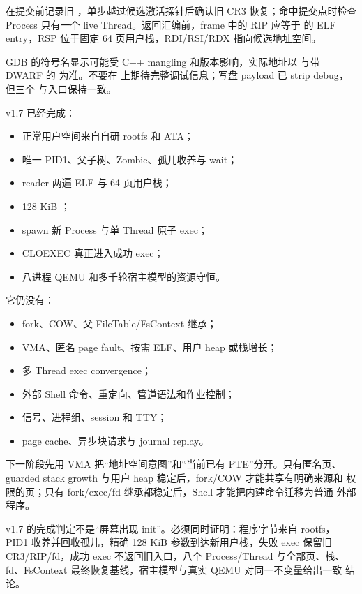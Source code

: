 在提交前记录旧 ，单步越过候选激活探针后确认旧 CR3
恢复；命中提交点时检查 Process 只有一个 live Thread。返回汇编前，frame
中的 RIP 应等于  的 ELF entry，RSP 位于固定
64 页用户栈，RDI/RSI/RDX 指向候选地址空间。

GDB 的符号名显示可能受 C++ mangling 和版本影响，实际地址以
 与带 DWARF 的  为准。不要在
 上期待完整调试信息；写盘 payload 已 strip
debug，但三个  与入口保持一致。

v1.7 已经完成：

\begin{itemize}
  \item 正常用户空间来自自研 rootfs 和 ATA；
  \item 唯一 PID1、父子树、Zombie、孤儿收养与 wait；
  \item reader 两遍 ELF 与 64 页用户栈；
  \item 128 KiB ；
  \item spawn 新 Process 与单 Thread 原子 exec；
  \item CLOEXEC 真正进入成功 exec；
  \item 八进程 QEMU 和多千轮宿主模型的资源守恒。
\end{itemize}

它仍没有：

\begin{itemize}
  \item fork、COW、父 FileTable/FsContext 继承；
  \item VMA、匿名 page fault、按需 ELF、用户 heap 或栈增长；
  \item 多 Thread exec convergence；
  \item 外部 Shell 命令、重定向、管道语法和作业控制；
  \item 信号、进程组、session 和 TTY；
  \item page cache、异步块请求与 journal replay。
\end{itemize}

下一阶段先用 VMA 把“地址空间意图”和“当前已有 PTE”分开。只有匿名页、
guarded stack growth 与用户 heap 稳定后，fork/COW 才能共享有明确来源和
权限的页；只有 fork/exec/fd 继承都稳定后，Shell 才能把内建命令迁移为普通
外部程序。

\begin{contractbox}
v1.7 的完成判定不是“屏幕出现 init”。必须同时证明：程序字节来自 rootfs，
PID1 收养并回收孤儿，精确 128 KiB 参数到达新用户栈，失败 exec 保留旧
CR3/RIP/fd，成功 exec 不返回旧入口，八个 Process/Thread 与全部页、栈、
fd、FsContext 最终恢复基线，宿主模型与真实 QEMU 对同一不变量给出一致
结论。
\end{contractbox}
